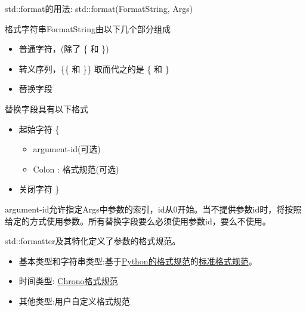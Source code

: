 std::format的用法: std::format(FormatString, Args) 

格式字符串FormatString由以下几个部分组成

\begin{itemize}
\item 
普通字符，(除了 \{ 和 \})

\item 
转义序列，\{\{ 和 \}\} 取而代之的是 \{ 和 \}

\item 
替换字段
\end{itemize}

替换字段具有以下格式

\begin{itemize}
\item 
起始字符 \{
\begin{itemize}
\item 
argument-id(可选)

\item 
Colon : 格式规范(可选)
\end{itemize}

\item 
关闭字符 \}
\end{itemize}

argument-id允许指定Args中参数的索引，id从0开始。当不提供参数id时，将按照给定的方式使用参数。所有替换字段要么必须使用参数id，要么不使用。

std::formatter及其特化定义了参数的格式规范。

\begin{itemize}
\item 
基本类型和字符串类型:基于\href{https://docs.python.org/3/library/string.html#formatspec}{Python的格式规范}的\href{https://en.cppreference.com/w/cpp/utility/format/formatter#Standard_format_specification}{标准格式规范}。

\item 
时间类型: \href{https://en.cppreference.com/w/cpp/chrono/system_clock/formatter#Format_specification}{Chrono格式规范}

\item 
其他类型:用户自定义格式规范
\end{itemize}



























